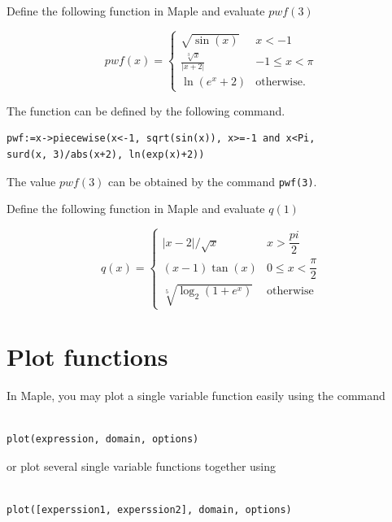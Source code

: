 \documentclass[]{book}
\theoremstyle{definition}
\theoremstyle{definition}
\theoremstyle{definition}
\theoremstyle{remark}
\let\BeginKnitrBlock\begin \let\EndKnitrBlock\end
\begin{document}
\BeginKnitrBlock{example}
\protect\hypertarget{exm:unnamed-chunk-5}{}{\label{exm:unnamed-chunk-5} }
Define the following function in Maple and evaluate \(pwf(3)\)

\[
pwf(x) =
  \begin{cases}
    \sqrt{\sin(x)} & x<-1\\
    \frac{\sqrt[3]{x}}{|x+2|} & -1\leq x<\pi\\
    \ln(e^x+2) & \text{otherwise}.
  \end{cases}
\]
\EndKnitrBlock{example}

\BeginKnitrBlock{solution}
{}
The function can be defined by the following command.

\begin{verbatim}
pwf:=x->piecewise(x<-1, sqrt(sin(x)), x>=-1 and x<Pi,
surd(x, 3)/abs(x+2), ln(exp(x)+2))
\end{verbatim}

The value \(pwf(3)\) can be obtained by the command \texttt{pwf(3)}.
\EndKnitrBlock{solution}

\BeginKnitrBlock{exercise}
\protect\hypertarget{exr:piecewise-exer1}{}{\label{exr:piecewise-exer1} }
Define the following function in Maple and evaluate \(q(1)\)

\[
q(x) =
\begin{cases}
  |x-2|/\sqrt{x} & x>\dfrac{pi}{2}\\
  (x-1)\tan(x) & 0\leq x< \dfrac{\pi}{2}\\
  \sqrt[5]{\log_2(1+e^x)} & \text{otherwise}
\end{cases}
\]
\EndKnitrBlock{exercise}

\hypertarget{plot-functions}{%
\section{Plot functions}\label{plot-functions}}

In Maple, you may plot a single variable function easily using the command

\begin{verbatim}

plot(expression, domain, options)
\end{verbatim}

or plot several single variable functions together using

\begin{verbatim}

plot([experssion1, experssion2], domain, options)
\end{verbatim}
\end{document}
